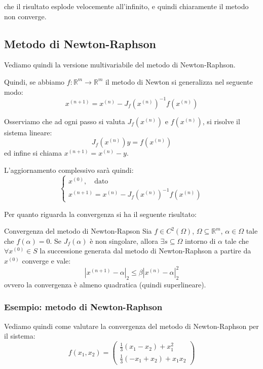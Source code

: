 \documentclass[a4paper,11pt]{article}
\begin{document}
\begin{itemize}
\begin{center}
		\end{center}
		che il risultato esplode velocemente all'infinito, e quindi chiaramente il metodo non converge.
\end{itemize}

\subsection{Metodo di Newton-Raphson}
Vediamo quindi la versione multivariabile del metodo di Newton-Raphson.

Quindi, se abbiamo $f : \mathbb{R}^m \rightarrow \mathbb{R}^m$ il metodo di Newton si generalizza nel seguente modo:
$$
x^{(n + 1)} = x^{(n)} - J_f (x^{(n)})^{-1} f(x^{(n)})
$$

Osserviamo che ad ogni passo si valuta $J_f(x^{(n)})$ e $f(x^{(n)})$, si risolve il sistema lineare:
$$
J_f(x^{(n)}) y = f(x^{(n)})
$$
ed infine si chiama $x^{(n + 1)} = x^{(n)} - y$.

L'aggiornamento complessivo sarà quindi:
\[
	\begin{cases}
		x^{(0)}, \quad \text{dato} \\
		x^{(n + 1)} = x^{(n)} - J_f(x^{(n)})^{-1} f(x^{(n)})
	\end{cases}
\]

Per quanto riguarda la convergenza si ha il seguente risultato:
\begin{theorem}{Convergenza del metodo di Newton-Rapson}
	Sia $f \in C^2(\Omega)$, $\Omega \subseteq \mathbb{R}^m$, $\alpha \in \Omega$ tale che $f(\alpha) = 0$.
	Se $J_f(\alpha)$ è non singolare, allora $\exists s \subseteq \Omega$ intorno di $\alpha$ tale che $\forall x^{(0)} \in S$ la successione generata dal metodo di Newton-Raphson a partire da $x^{(0)}$ converge e vale:
	$$
	|x^{(n + 1)} - \alpha|_2 \leq \beta |x^{(n)} - \alpha |_2^2
	$$
	ovvero la convergenza è almeno quadratica (quindi superlineare).
\end{theorem}

\subsubsection{Esempio: metodo di Newton-Raphson}
Vediamo quindi come valutare la convergenza del metodo di Newton-Raphson per il sistema:
$$
f(x_1, x_2) =
\begin{pmatrix}
	\frac{1}{3} (x_1 - x_2) + x_1^2 \\
	\frac{1}{3} (-x_1 + x_2) + x_1 x_2
\end{pmatrix}
$$
\end{document}

